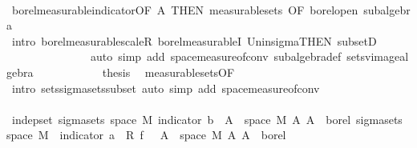 \begin{isabellebody}
\ \ \ \ \ \ \ \ \ \ \ \ \isamarkupfalse%
\ borel{\isacharunderscore}{\kern0pt}measurable{\isacharunderscore}{\kern0pt}indicator{\isacharbrackleft}{\kern0pt}OF\ A{\isacharparenleft}{\kern0pt}{}{\isacharparenright}{\kern0pt}{\isacharcomma}{\kern0pt}\ THEN\ measurable{\isacharunderscore}{\kern0pt}sets{\isacharcomma}{\kern0pt}\ OF\ borel{\isacharunderscore}{\kern0pt}open{\isacharbrackright}{\kern0pt}\ subalgebra\isanewline
\ \ \ \ \ \ \ \ \ \ \ \ \isamarkupfalse%
\ {\isacharparenleft}{\kern0pt}intro\ borel{\isacharunderscore}{\kern0pt}measurable{\isacharunderscore}{\kern0pt}scaleR\ borel{\isacharunderscore}{\kern0pt}measurableI\ Un{\isacharunderscore}{\kern0pt}in{\isacharunderscore}{\kern0pt}sigma{\isacharbrackleft}{\kern0pt}THEN\ subsetD{\isacharbrackright}{\kern0pt}{\isacharparenright}{\kern0pt}\isanewline
\ \ \ \ \ \ \ \ \ \ \ \ \ \ \ {\isacharparenleft}{\kern0pt}auto\ simp\ add{\isacharcolon}{\kern0pt}\ space{\isacharunderscore}{\kern0pt}measure{\isacharunderscore}{\kern0pt}of{\isacharunderscore}{\kern0pt}conv\ subalgebra{\isacharunderscore}{\kern0pt}def\ sets{\isacharunderscore}{\kern0pt}vimage{\isacharunderscore}{\kern0pt}algebra{}{\isacharparenright}{\kern0pt}\isanewline
\ \ \ \ \ \ \ \ \ \ \isamarkupfalse%
\ {\isacharquery}{\kern0pt}thesis\ \isamarkupfalse%
\ measurable{\isacharunderscore}{\kern0pt}sets{\isacharbrackleft}{\kern0pt}OF\ {\isacharasterisk}{\kern0pt}{\isacharbrackright}{\kern0pt}\ \isamarkupfalse%
\ {\isacharparenleft}{\kern0pt}intro\ sets{\isachardot}{\kern0pt}sigma{\isacharunderscore}{\kern0pt}sets{\isacharunderscore}{\kern0pt}subset{\isacharprime}{\kern0pt}{\isacharcomma}{\kern0pt}\ auto\ simp\ add{\isacharcolon}{\kern0pt}\ space{\isacharunderscore}{\kern0pt}measure{\isacharunderscore}{\kern0pt}of{\isacharunderscore}{\kern0pt}conv{\isacharparenright}{\kern0pt}\isanewline
\ \ \ \ \ \ \ \ \isamarkupfalse%
\isanewline
\ \ \ \ \ \ \ \ \isamarkupfalse%
\ {\isachardoublequoteopen}indep{\isacharunderscore}{\kern0pt}set\ {\isacharparenleft}{\kern0pt}sigma{\isacharunderscore}{\kern0pt}sets\ {\isacharparenleft}{\kern0pt}space\ M{\isacharparenright}{\kern0pt}\ {\isacharbraceleft}{\kern0pt}indicator\ b\ {\isacharminus}{\kern0pt}{\isacharbackquote}{\kern0pt}\ A\ {\isasyminter}\ space\ M\ {\isacharbar}{\kern0pt}A{\isachardot}{\kern0pt}\ A\ {\isasymin}\ borel{\isacharbraceright}{\kern0pt}{\isacharparenright}{\kern0pt}\ {\isacharparenleft}{\kern0pt}sigma{\isacharunderscore}{\kern0pt}sets\ {\isacharparenleft}{\kern0pt}space\ M{\isacharparenright}{\kern0pt}\ {\isacharbraceleft}{\kern0pt}{\isacharparenleft}{\kern0pt}{\isasymlambda}{\isasymomega}{\isachardot}{\kern0pt}\ indicator\ a\ {\isasymomega}\ {\isacharasterisk}{\kern0pt}\isactrlsub R\ f\ {\isasymomega}{\isacharparenright}{\kern0pt}\ {\isacharminus}{\kern0pt}{\isacharbackquote}{\kern0pt}\ A\ {\isasyminter}\ space\ M\ {\isacharbar}{\kern0pt}A{\isachardot}{\kern0pt}\ A\ {\isasymin}\ borel{\isacharbraceright}{\kern0pt}{\isacharparenright}{\kern0pt}{\isachardoublequoteclose}\ \isanewline

\end{isabellebody}
